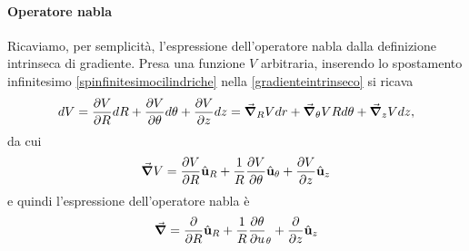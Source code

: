 \paragraph{Operatore nabla}
Ricaviamo, per semplicità, l'espressione dell'operatore nabla dalla definizione intrinseca di gradiente. Presa una funzione $V$ arbitraria, inserendo lo spostamento infinitesimo \ref{spinfinitesimocilindriche} nella \ref{gradienteintrinseco} si ricava
\begin{equation*}
	dV=\pdv{V}{R}dR+\pdv{V}{\theta}d\theta+\pdv{V}{z}dz=\grad_R{V}dr+\grad_\theta{V}Rd\theta+\grad_z{V}dz,
\end{equation*}
da cui
\begin{equation}
	\grad{V}=\pdv{V}{R}\hat{\mathbf{u}}_R+\frac{1}{R}\pdv{V}{\theta}\hat{\mathbf{u}}_\theta+\pdv{V}{z}\hat{\mathbf{u}}_z
\end{equation}
e quindi l'espressione dell'operatore nabla è
\begin{equation}
	\grad =\pdv{R}\hat{\mathbf{u}}_R+\frac{1}{R}\pdv{\theta}{u}_\theta+\pdv{z}\hat{\mathbf{u}}_z
\end{equation}
